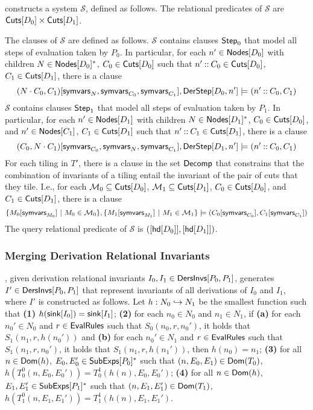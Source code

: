 %
\verifyders constructs a system $\mathcal{S}$, defined as follows.
The relational predicates of $\mathcal{S}$ are $\mathsf{Cuts}[ D_0 ] \times
\mathsf{Cuts}[ D_1 ]$.

The clauses of $\mathcal{S}$ are defined as follows.
%
$\mathcal{S}$ contains clauses $\mathsf{Step}_0$ that model all steps
of evaluation taken by $P_0$.
%
In particular, for each $n' \in \mathsf{Nodes}[ D_0 ]$ with children $N \in
\mathsf{Nodes}[ D_0 ]^{*}$, %
$C_0 \in \mathsf{Cuts}[ D_0 ]$ such that $n' \mathbin{::} C_0 \in \mathsf{Cuts}[ D_0 ]$,
$C_1 \in \mathsf{Cuts}[ D_1 ]$, there is a clause %
\[ (N \concat C_0, C_1)[ \symvars{N}, \symvars{C_0}, \symvars{C_1} ], %
\derstep{D_0}{ n' } \entails %
(n' \cons C_0, C_1) \]
%
%
$\mathcal{S}$ contains clauses $\mathsf{Step}_1$ that model all steps
of evaluation taken by $P_1$.
%
In particular, for each $n' \in \mathsf{Nodes}[ D_1 ]$ with children $N \in
\mathsf{Nodes}[ D_1 ]^{*}$, %
$C_0 \in \mathsf{Cuts}[ D_0 ]$, and %
$n' \in \mathsf{Nodes}[ C_1 ]$, %
$C_1 \in \mathsf{Cuts}[ D_1 ]$ such that $n' \mathbin{::} C_1 \in \mathsf{Cuts}[ D_1 ]$, %
there is a clause %
\[ (C_0, N \concat C_1)[ \symvars{C_0}, \symvars{N}, \symvars{C_1} ], %
\derstep{D_1}{ n' } \entails %
(n' \cons C_0, C_1) \]
%
For each tiling in $T'$, there is a clause in the set $\mathsf{Decomp}$
that constrains that the combination of invariants of a tiling entail
the invariant of the pair of cuts that they tile.
%
I.e., for each $\mathcal{M}_0 \subseteq \mathsf{Cuts}[ D_0 ]$, %
$\mathcal{M}_1 \subseteq \mathsf{Cuts}[ D_1 ]$, %
$C_0 \in \mathsf{Cuts}[ D_0 ]$, and %
$C_1 \in \mathsf{Cuts}[ D_1 ]$, there is a clause
%
\[ \setformer{ M_0[ \symvars{ M_0 } ]}{ M_0 \in \mathcal{M}_0 }, %
\setformer{ M_1[ \symvars{ M_1 } ] }{ M_1 \in \mathcal{M}_1 } \entails %
(C_0[ \symvars{C_0} ], C_1[ \symvars{C_1} ])
\]
%
The query relational predicate of $\mathcal{S}$ is $( [ \mathsf{hd}[ D_0 ] ],
[ \mathsf{hd}[ D_1 ] ])$.

\subsubsection{Merging Derivation Relational Invariants}
%
\mergeinvs, given derivation relational invariants $I_0, I_1 \in
\mathsf{DersInvs}[ P_0, P_1 ]$, generates $I' \in \mathsf{DersInvs}[ P_0, P_1 ]$ that
represent invariants of all derivations of $I_0$ and $I_1$,
where $I'$ is constructed as follows.
Let $h : N_0 \hookrightarrow N_1$ be the smallest function such that %
\textbf{(1)} $h(\mathsf{sink}[ I_0 ]) = \mathsf{sink}[ I_1 ]$; %
\textbf{(2)} for each $n_0 \in N_0$ and $n_1 \in N_1$, if \textbf{(a)}
for each $n_0' \in N_0$ and $r \in \mathsf{EvalRules}$ such that $S_0(n_0, r,
n_0')$, it holds that $S_1(n_1, r, h(n_0'))$ and %
\textbf{(b)} for each $n_0' \in N_1$ and $r \in \mathsf{EvalRules}$ such that
$S_1(n_1, r, n_0')$, it holds that $S_1(n_1, r, h(n_1'))$, then
$h(n_0) = n_1$; 
\textbf{(3)} for all $n \in \mathsf{Dom}(h)$, $E_0, E_0' \in
\mathsf{SubExps}[ P_0 ]^{*}$ such that $(n, E_0, E_1) \in \mathsf{Dom}(T_0)$,
$h(T_0^0(n, E_0, E_0')) = T_0^1(h(n), E_0, E_0')$;
\textbf{(4)} for all $n \in \mathsf{Dom}(h)$, $E_1, E_1' \in
\mathsf{SubExps}[ P_1 ]^{*}$ such that $(n, E_1, E_1') \in \mathsf{Dom}(T_1)$,
$h(T_1^0(n, E_1, E_1')) = T_1^1(h(n), E_1, E_1')$.

